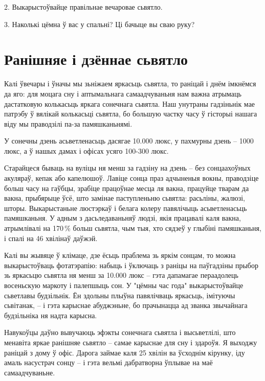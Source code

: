 2. Выкарыстоўвайце правільнае вечаровае сьвятло.

3. Наколькі цёмна ў вас у спальні? Ці бачыце вы сваю руку?


\section{Ранішняе і дзённае сьвятло}

Калі ўвечары і ўначы мы зьніжаем яркасьць сьвятла, то раніцай і днём імкнёмся да яго: для моцага сну і аптымальнага самаадчуваньня нам важна атрымаць дастатковую колькасьць яркага сонечнага сьвятла. Наш унутраны гадзіньнік мае патрэбу ў вялікай колькасьці сьвятла, бо большую частку часу ў гісторыі нашага віду мы праводзілі па-за памяшканьнямі.

У сонечны дзень асьветленасьць дасягае 10.000 люкс, у пахмурны дзень – 1000 люкс, а ў нашых дамах і офісах усяго 100-300 люкс.

Старайцеся бываць на вуліцы ня менш за гадзіну на дзень – без сонцаахоўных акуляраў, кепак або капелюшоў. Лавіце сонца праз адчыненыя вокны, праводзіце больш часу на гаўбцы, зрабіце працоўнае месца ля вакна, працуйце тварам да вакна, прыбярыце ўсё, што замінае паступленьню сьвятла: расьліны, жалюзі, шторы. Выкарыстаньне люстэркаў і белага колеру павялічыць асьветленасьць памяшканьня. У адным з дасьледаваньняў людзі, якія працавалі каля вакна, атрымлівалі на 170\,\% больш сьвятла, чым тыя, хто сядзеў у глыбіні памяшканьня, і спалі на 46 хвілінаў даўжэй.

Калі вы жывяце ў клімаце, дзе ёсьць праблема зь яркім сонцам, то можна выкарыстоўваць фотатэрапію: набыць і ўключаць з раніцы на паўгадзіны прыбор зь яркасьцю сьвятла ня менш за 10.000 люкс – гэта дапамагае пераадолець восеньскую маркоту і палепшыць сон. У "цёмны час года" выкарыстоўвайце сьветлавы будзільнік. Ён здольны плыўна павялічваць яркасьць, імітуючы сьвітанак, – і гэта карыснае абуджэньне, бо прачынацца ад званка звычайнага будзільніка ня надта карысна.

Навукоўцы даўно вывучаюць эфэкты сонечнага сьвятла і высьветлілі, што менавіта яркае ранішняе сьвятло – самае карыснае для сну і здароўя. Я выходжу раніцай з дому ў офіс. Дарога займае каля 25 хвілін ва ўсходнім кірунку, іду амаль насустрач сонцу – і гэта вельмі дабратворна ўплывае на маё самаадчуваньне.

